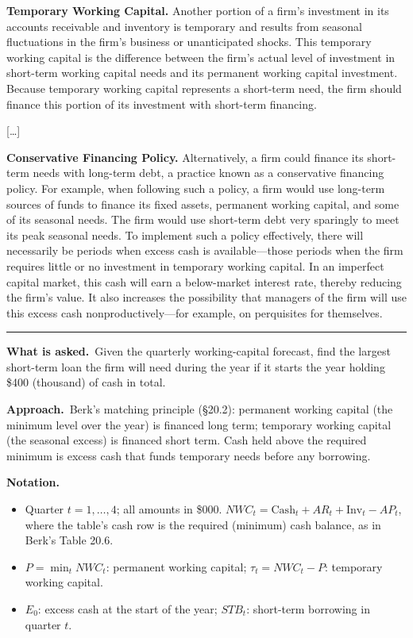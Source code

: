 \documentclass[11pt,a4paper]{article}
\newcommand{\notation}{\par\noindent\textbf{Notation.}}
\newcommand{\asked}{\par\medskip\noindent\textbf{What is asked.}~}
\newcommand{\approach}{\par\smallskip\noindent\textbf{Approach.}~}
\newcommand{\stmtend}{\par\endgroup\nopagebreak\noindent\rule{\linewidth}{0.4pt}\par\medskip}
\begin{document}
\textbf{Temporary Working Capital.} Another portion of a firm's investment in its accounts
receivable and inventory is temporary and results from seasonal fluctuations in the firm's business
or unanticipated shocks. This temporary working capital is the difference between the firm's actual
level of investment in short-term working capital needs and its permanent working capital
investment. Because temporary working capital represents a short-term need, the firm should finance
this portion of its investment with short-term financing.

{[}\ldots{]}

\textbf{Conservative Financing Policy.} Alternatively, a firm could finance its short-term needs
with long-term debt, a practice known as a conservative financing policy. For example, when
following such a policy, a firm would use long-term sources of funds to finance its fixed assets,
permanent working capital, and some of its seasonal needs. The firm would use short-term debt very
sparingly to meet its peak seasonal needs. To implement such a policy effectively, there will
necessarily be periods when excess cash is available---those periods when the firm requires little
or no investment in temporary working capital. In an imperfect capital market, this cash will earn a
below-market interest rate, thereby reducing the firm's value. It also increases the possibility
that managers of the firm will use this excess cash nonproductively---for example, on perquisites
for themselves.
\stmtend

\asked Given the quarterly working-capital forecast, find the largest short-term loan the firm will need during the year if it starts the year holding \$400 (thousand) of cash in total.

\approach Berk's matching principle (\S 20.2): permanent working capital (the minimum level over the year) is financed long term; temporary working capital (the seasonal excess) is financed short term. Cash held above the required minimum is excess cash that funds temporary needs before any borrowing.

\notation
\begin{itemize}
  \item Quarter $t=1,\dots,4$; all amounts in \$000. $NWC_t=\text{Cash}_t+AR_t+\text{Inv}_t-AP_t$, where the table's cash row is the required (minimum) cash balance, as in Berk's Table 20.6.
  \item $P=\min_t NWC_t$: permanent working capital; $\tau_t=NWC_t-P$: temporary working capital.
  \item $E_0$: excess cash at the start of the year; $STB_t$: short-term borrowing in quarter $t$.
\end{itemize}
\end{document}
